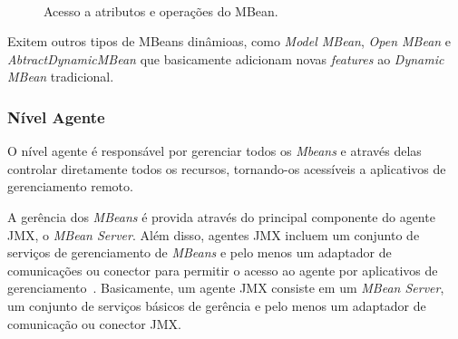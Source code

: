 \begin{figure}[htp]
\centering
{}
\\
\caption{Acesso a atributos e operações do MBean.}
\label{fig:requestjmx}
\end{figure}

Exitem outros tipos de MBeans dinâmioas, como \textit{Model MBean}, \textit{Open MBean} e \textit{AbtractDynamicMBean} que basicamente adicionam novas \textit{features} ao \textit{Dynamic MBean} tradicional. 

\subsubsection{Nível Agente}
O nível agente é responsável por gerenciar todos os \textit{Mbeans} e através delas controlar diretamente todos os recursos, tornando-os acessíveis a aplicativos de gerenciamento remoto.

A gerência dos \textit{MBeans} é provida através do principal componente do agente JMX, o \textit{MBean Server}. Além disso, agentes JMX incluem um conjunto de serviços de gerenciamento de \textit{MBeans} e pelo menos um adaptador de comunicações ou conector para permitir o acesso ao agente por aplicativos de gerenciamento~\cite{jmx}. Basicamente, um agente JMX consiste em um \textit{MBean Server}, um conjunto de serviços básicos de gerência e pelo menos um adaptador de comunicação ou conector JMX.

